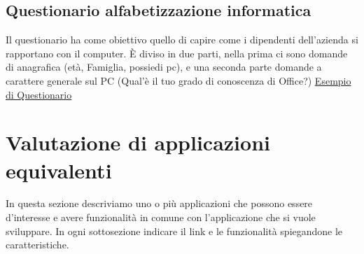 \documentclass[11pt]{article}
\begin{document}
\subsection{Questionario alfabetizzazione informatica}
Il questionario ha come obiettivo quello di capire come i dipendenti
dell'azienda si rapportano con il computer.  \`E diviso in due parti,
nella prima ci sono domande di anagrafica (et\`a, Famiglia, possiedi
pc), e una seconda parte domande a carattere generale sul PC (Qual'\`e
il tuo grado di conoscenza di Office?)
\href{http://www00.unibg.it/dati/bacheca/313/9143.pdf}{Esempio di Questionario}


\section{Valutazione di applicazioni equivalenti}
In questa sezione descriviamo uno o pi\`u applicazioni che possono
essere d'interesse e avere funzionalit\`a in comune con l'applicazione
che si vuole sviluppare. In ogni sottosezione indicare il link e le
funzionalit\`a spiegandone le caratteristiche.
\end{document}
